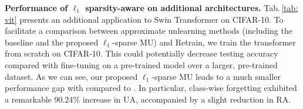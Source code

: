 \begin{table}[htb]
\centering
\caption{Performance   of  {\MUSparse} vs. {\retrain} and {\FT} on (\textbf{Swin Transformer}, CIFAR-10).}
\label{tab: vit}
\vspace*{-3mm}
\end{table}
{\noindent \textbf{Performance of $\ell_1$ sparsity-aware {\MU} on additional architectures.}}
Tab.\,\ref{tab: vit} presents an additional application to Swin Transformer on  CIFAR-10. To facilitate a comparison between approximate unlearning methods (including the {\FT} baseline and the proposed $\ell_1$-sparse MU) and Retrain, we train the transformer from scratch on CIFAR-10. This could potentially decrease testing accuracy compared with fine-tuning on a pre-trained model over a larger, pre-trained dataset. As we can see,  our proposed $\ell_1$-sparse MU  leads to a much smaller performance gap with {\retrain} compared to {\FT}. In particular, class-wise forgetting exhibited a remarkable $90.24\%$ increase in UA, accompanied by a slight reduction in RA.


